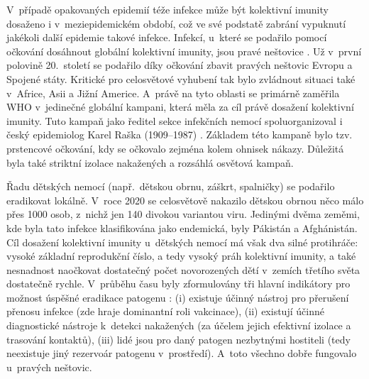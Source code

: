 V~případě opakovaných epidemií téže infekce může být kolektivní imunity do\-sa\-že\-no i v~meziepidemickém období, což ve své podstatě zabrání vypuknutí jakékoli další epidemie takové infekce. Infekcí, u~které se podařilo pomocí očkování dosáhnout globální kolektivní imunity, jsou pravé neštovice \cite{smallpox1}. Už v~první polovině 20.\ století se podařilo díky očkování zbavit pravých neštovic Evropu a Spojené státy. Kritické pro celosvětové vyhubení tak bylo zvládnout situaci také v~Africe, Asii a Jižní Americe. A~právě na tyto oblasti se primárně zaměřila WHO v~jedinečné globální kampani, která měla za cíl právě dosažení kolektivní imunity. Tuto kampaň jako ředitel sekce infekčních nemocí spoluorganizoval i český epidemiolog Karel Raška (1909--1987) \cite{smallpox2}. Základem této kampaně bylo tzv. prstencové očkování, kdy se očkovalo zejména kolem ohnisek nákazy. Důležitá byla také striktní izolace nakažených a rozsáhlá osvětová kampaň.

Řadu dětských nemocí (např.\ dětskou obrnu, záškrt, spalničky) se podařilo eradikovat lokálně. V~roce 2020 se celosvětově nakazilo dětskou obrnou něco málo přes 1000 osob, z~nichž jen 140 divokou variantou viru. Jedinými dvěma zeměmi, kde byla tato infekce klasifikována jako endemická, byly Pákistán a Afghánistán. Cíl dosažení kolektivní imunity u~dětských nemocí má však dva silné protihráče: vysoké základní reprodukční číslo, a tedy vysoký práh kolektivní imunity, a také nesnadnost naočkovat dostatečný počet novorozených dětí v~zemích třetího světa dostatečně rychle. V~průběhu času byly zformulovány tři hlavní indikátory pro možnost úspěšné eradikace patogenu \cite{Dowdle1999}: (i) existuje účinný nástroj pro přerušení přenosu infekce (zde hraje dominantní roli vakcinace), (ii) existují účinné diagnostické nástroje k~detekci nakažených (za účelem jejich efektivní izolace a trasování kontaktů), (iii) lidé jsou pro daný patogen nezbytnými hostiteli (tedy neexistuje jiný rezervoár patogenu v~prostředí). A~toto všechno dobře fungovalo u~pravých neštovic.

